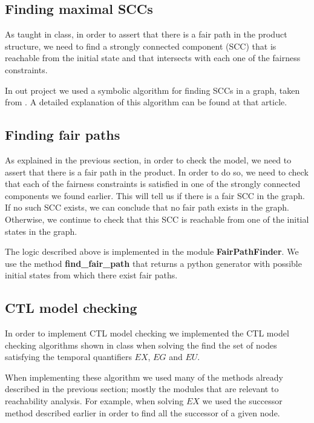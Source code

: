 \documentclass[11pt]{article}
\begin{document}
    \subsection{Finding maximal SCCs}
        As taught in class, in order to assert that there is a fair path in the 
        product structure, we need to find a strongly connected component (SCC)
        that is reachable from the initial state and that intersects with
        each one of the fairness constraints.

        In out project we used a symbolic algorithm for finding SCCs in a graph, taken from
        \cite{scc}. A detailed explanation of this algorithm can be found at that article.
        
    \subsection{Finding fair paths}
        As explained in the previous section, in order to check the model, we
        need to assert that there is a fair path in the product. In order to do 
        so, we need to check that each of the fairness constraints is satisfied
        in one of the strongly connected components we found earlier.
        This will tell us if there is a fair SCC in the graph. If no such SCC 
        exists, we can conclude that no fair path exists in the graph. Otherwise,
        we continue to check that this SCC is reachable from one of the initial
        states in the graph.
        
        The logic described above is implemented in the module 
        \textbf{FairPathFinder}. We use the method \textbf{find\_fair\_path}
        that returns a python generator with possible initial states from
        which there exist fair paths.

    \subsection{CTL model checking}
        In order to implement CTL model checking we implemented the CTL model
        checking algorithms shown in class when solving the find the set
        of nodes satisfying the temporal quantifiers $EX$, $EG$ and $EU$.

        When implementing these algorithm we used many of the methods already
        described in the previous section; mostly the modules that are relevant
        to reachability analysis. For example, when solving $EX$ we used the
        successor method described earlier in order to find all the successor
        of a given node.
\end{document}
